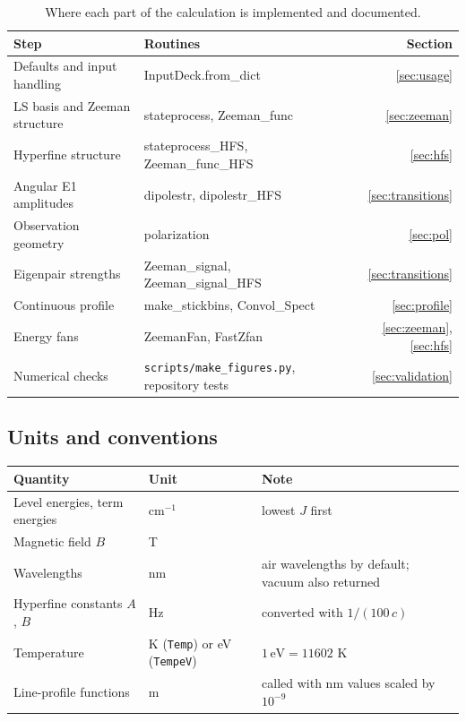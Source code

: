 \documentclass[11pt,a4paper]{article}
\newcommand{\code}[1]{\texttt{#1}}
\newcommand{\routine}[1]{\textsf{#1}}
\numberwithin{equation}{section}
\begin{document}
\begin{table}[!htbp]
\centering\small
\begin{tabularx}{\textwidth}{>{\raggedright\arraybackslash}p{4.2cm}>{\raggedright\arraybackslash}X r}
\toprule
Step & Routines & Section\\
\midrule
Defaults and input handling & \routine{InputDeck.from\_dict} & \ref{sec:usage}\\
LS basis and Zeeman structure & \routine{stateprocess}, \routine{Zeeman\_func} & \ref{sec:zeeman}\\
Hyperfine structure & \routine{stateprocess\_HFS}, \routine{Zeeman\_func\_HFS} & \ref{sec:hfs}\\
Angular E1 amplitudes & \routine{dipolestr}, \routine{dipolestr\_HFS} & \ref{sec:transitions}\\
Observation geometry & \routine{polarization} & \ref{sec:pol}\\
Eigenpair strengths & \routine{Zeeman\_signal}, \routine{Zeeman\_signal\_HFS} & \ref{sec:transitions}\\
Continuous profile & \routine{make\_stickbins}, \routine{Convol\_Spect} & \ref{sec:profile}\\
Energy fans & \routine{ZeemanFan}, \routine{FastZfan} & \ref{sec:zeeman}, \ref{sec:hfs}\\
Numerical checks & \code{scripts/make\_figures.py}, repository tests & \ref{sec:validation}\\
\bottomrule
\end{tabularx}
\caption{Where each part of the calculation is implemented and documented.}
\label{tab:flowmap}
\end{table}

\subsection{Units and conventions}\label{sec:units}
\begin{center}\small
\begin{tabularx}{\textwidth}{>{\raggedright\arraybackslash}p{4.2cm}>{\raggedright\arraybackslash}p{3.6cm}>{\raggedright\arraybackslash}X}
\toprule
Quantity & Unit & Note\\
\midrule
Level energies, term energies & cm$^{-1}$ & lowest $J$ first\\
Magnetic field $B$ & T & \\
Wavelengths & nm & air wavelengths by default; vacuum also returned\\
Hyperfine constants $A$, $B$ & Hz & converted with $1/(100\,c)$\\
Temperature & K (\code{Temp}) or eV (\code{TempeV}) & $1\,\mathrm{eV}=11602$ K\\
Line-profile functions & m & called with nm values scaled by $10^{-9}$\\
\bottomrule
\end{tabularx}
\end{center}
\end{document}
